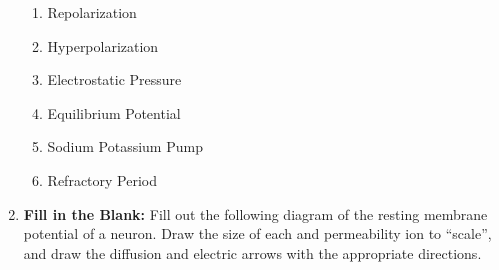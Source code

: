 \begin{enumerate}[label=\textbf{Q2.3.\arabic*}]
\begin{enumerate}[label=(\arabic*)]
                  \item Repolarization \quad \dotfill \quad \underline{\hspace{1cm}}\\
                  \item Hyperpolarization \quad \dotfill \quad \underline{\hspace{1cm}}\\
                  \item Electrostatic Pressure \quad \dotfill \quad \underline{\hspace{1cm}}\\
                  \item Equilibrium Potential \quad \dotfill \quad \underline{\hspace{1cm}}\\
                  \item Sodium Potassium Pump \quad \dotfill \quad \underline{\hspace{1cm}}\\
                  \item Refractory Period \quad \dotfill \quad \underline{\hspace{1cm}}
            \end{enumerate}
      \newpage

      

      \item \textbf{Fill in the Blank:} Fill out the following diagram of the resting membrane potential of a neuron. Draw the size of each and permeability ion to ``scale'', and draw the diffusion and electric arrows with the appropriate directions. \\

          
          
          

\end{enumerate}
